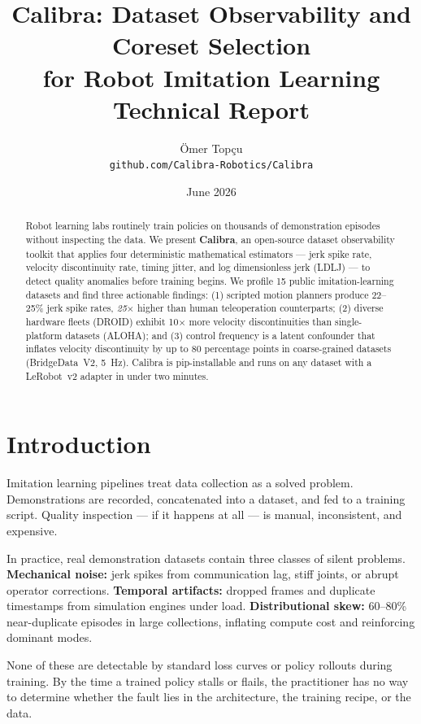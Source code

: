 \documentclass[10pt,twocolumn]{article}
\title{\textbf{Calibra: Dataset Observability and Coreset Selection\\
for Robot Imitation Learning}\\[0.5em]
\large Technical Report}
\author{
  Ömer Topçu\\
  \texttt{github.com/Calibra-Robotics/Calibra}
}
\date{June 2026}
\begin{document}
\maketitle

\begin{abstract}
Robot learning labs routinely train policies on thousands of demonstration
episodes without inspecting the data. We present \textbf{Calibra}, an
open-source dataset observability toolkit that applies four deterministic
mathematical estimators — jerk spike rate, velocity discontinuity rate,
timing jitter, and log dimensionless jerk (LDLJ) — to detect quality
anomalies before training begins. We profile 15 public imitation-learning
datasets and find three actionable findings: (1) scripted motion planners
produce 22–25\% jerk spike rates, \emph{25$\times$} higher than human
teleoperation counterparts; (2) diverse hardware fleets (DROID) exhibit
10$\times$ more velocity discontinuities than single-platform datasets
(ALOHA); and (3) control frequency is a latent confounder that inflates
velocity discontinuity by up to 80 percentage points in coarse-grained
datasets (BridgeData~V2, 5~Hz). Calibra is pip-installable and runs on
any dataset with a LeRobot~v2 adapter in under two minutes.
\end{abstract}

\section{Introduction}
\label{sec:intro}

Imitation learning pipelines treat data collection as a solved problem.
Demonstrations are recorded, concatenated into a dataset, and fed to a
training script. Quality inspection — if it happens at all — is manual,
inconsistent, and expensive.

In practice, real demonstration datasets contain three classes of silent
problems. \textbf{Mechanical noise:} jerk spikes from communication lag,
stiff joints, or abrupt operator corrections. \textbf{Temporal artifacts:}
dropped frames and duplicate timestamps from simulation engines under load.
\textbf{Distributional skew:} 60–80\% near-duplicate episodes in large
collections, inflating compute cost and reinforcing dominant modes.

None of these are detectable by standard loss curves or policy rollouts
during training. By the time a trained policy stalls or flails, the
practitioner has no way to determine whether the fault lies in the
architecture, the training recipe, or the data.
\end{document}
